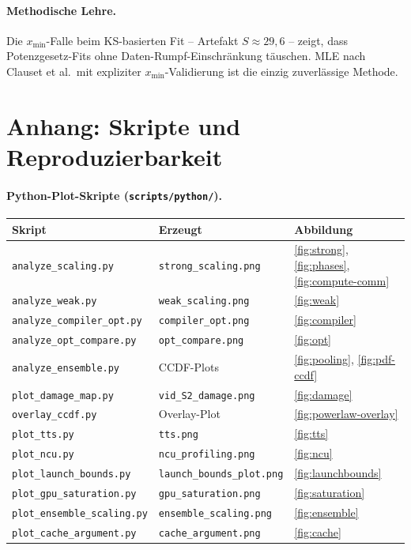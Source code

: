 \documentclass[11pt,a4paper]{article}
\begin{document}
\paragraph{Methodische Lehre.}
Die $x_\text{min}$-Falle beim KS-basierten Fit -- Artefakt $S \approx 29{,}6$ --
zeigt, dass Potenzgesetz-Fits ohne Daten-Rumpf-Einschränkung täuschen.
MLE nach Clauset et al.\ mit expliziter $x_\text{min}$-Validierung ist die
einzig zuverlässige Methode.

\appendix
\FloatBarrier
\section{Anhang: Skripte und Reproduzierbarkeit}
\label{app:scripts}

\paragraph{Python-Plot-Skripte (\texttt{scripts/python/}).}
\begin{center}\small
\begin{tabular}{@{}lll@{}}
\toprule
Skript & Erzeugt & Abbildung \\
\midrule
\texttt{analyze\_scaling.py}    & \texttt{strong\_scaling.png}\footnotemark & \ref{fig:strong}, \ref{fig:phases}, \ref{fig:compute-comm} \\
\texttt{analyze\_weak.py}       & \texttt{weak\_scaling.png}\footnotemark[\value{footnote}]   & \ref{fig:weak} \\
\texttt{analyze\_compiler\_opt.py} & \texttt{compiler\_opt.png}\footnotemark[\value{footnote}] & \ref{fig:compiler} \\
\texttt{analyze\_opt\_compare.py}  & \texttt{opt\_compare.png}\footnotemark[\value{footnote}]  & \ref{fig:opt} \\
\texttt{analyze\_ensemble.py}   & CCDF-Plots                  & \ref{fig:pooling}, \ref{fig:pdf-ccdf} \\
\texttt{plot\_damage\_map.py}   & \texttt{vid\_S2\_damage.png} & \ref{fig:damage} \\
\texttt{overlay\_ccdf.py}       & Overlay-Plot                & \ref{fig:powerlaw-overlay} \\
\texttt{plot\_tts.py}           & \texttt{tts.png}            & \ref{fig:tts} \\
\texttt{plot\_ncu.py}           & \texttt{ncu\_profiling.png} & \ref{fig:ncu} \\
\texttt{plot\_launch\_bounds.py} & \texttt{launch\_bounds\_plot.png} & \ref{fig:launchbounds} \\
\texttt{plot\_gpu\_saturation.py} & \texttt{gpu\_saturation.png} & \ref{fig:saturation} \\
\texttt{plot\_ensemble\_scaling.py} & \texttt{ensemble\_scaling.png} & \ref{fig:ensemble} \\
\texttt{plot\_cache\_argument.py} & \texttt{cache\_argument.png} & \ref{fig:cache} \\
\bottomrule
\end{tabular}
\end{center}
\end{document}
